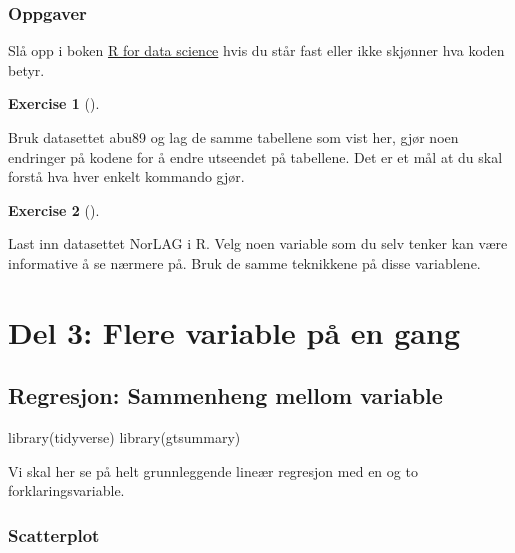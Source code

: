 \documentclass[
  letterpaper,
  DIV=11,
  numbers=noendperiod]{scrreprt}
\newenvironment{Shaded}{\begin{snugshade}}{\end{snugshade}}
\newcommand{\FunctionTok}[1]{\textcolor[rgb]{0.28,0.35,0.67}{#1}}
\newcommand{\NormalTok}[1]{\textcolor[rgb]{0.00,0.23,0.31}{#1}}
\theoremstyle{definition}
\newtheorem{exercise}{Exercise}[chapter]
\theoremstyle{remark}
\begin{document}
\hypertarget{oppgaver-3}{%
\section{Oppgaver}\label{oppgaver-3}}

Slå opp i boken \href{https://r4ds.had.co.nz/data-visualisation.html}{R
for data science} hvis du står fast eller ikke skjønner hva koden betyr.

\leavevmode{}%
\begin{exercise}[]\label{exr-}

Bruk datasettet abu89 og lag de samme tabellene som vist her, gjør noen
endringer på kodene for å endre utseendet på tabellene. Det er et mål at
du skal forstå hva hver enkelt kommando gjør.

\end{exercise}

\leavevmode{}%
\begin{exercise}[]\label{exr-}

Last inn datasettet NorLAG i R. Velg noen variable som du selv tenker
kan være informative å se nærmere på. Bruk de samme teknikkene på disse
variablene.

\end{exercise}

\part{Del 3: Flere variable på en gang}

\hypertarget{regresjon-sammenheng-mellom-variable}{%
\chapter{Regresjon: Sammenheng mellom
variable}\label{regresjon-sammenheng-mellom-variable}}

\begin{Shaded}
\begin{Highlighting}[]
\FunctionTok{library}\NormalTok{(tidyverse)}
\FunctionTok{library}\NormalTok{(gtsummary)}
\end{Highlighting}
\end{Shaded}

Vi skal her se på helt grunnleggende lineær regresjon med en og to
forklaringsvariable.

\hypertarget{scatterplot-1}{%
\section{Scatterplot}\label{scatterplot-1}}
\end{document}
